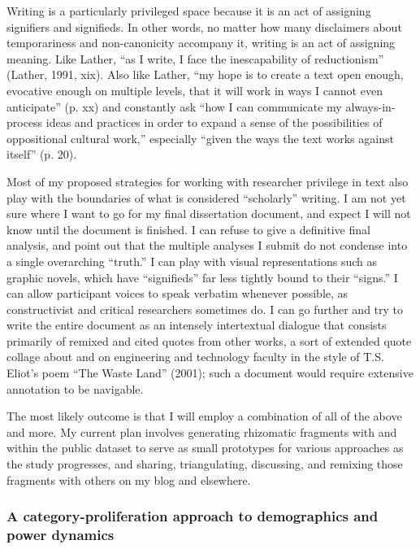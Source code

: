 Writing is a particularly privileged space because it is an act of assigning signifiers and signifieds. In other words, no matter how many disclaimers about temporariness and non-canonicity accompany it, writing is an act of assigning meaning. Like Lather, “as I write, I face the inescapability of reductionism” (Lather, 1991, xix). Also like Lather, “my hope is to create a text open enough, evocative enough on multiple levels, that it will work in ways I cannot even anticipate” (p. xx) and constantly ask “how I can communicate my always-in-process ideas and practices in order to expand a sense of the possibilities of oppositional cultural work,” especially “given the ways the text works against itself” (p. 20).

Most of my proposed strategies for working with researcher privilege in text also play with the boundaries of what is considered “scholarly” writing. I am not yet sure where I want to go for my final dissertation document, and expect I will not know until the document is finished. I can refuse to give a definitive final analysis, and point out that the multiple analyses I submit do not condense into a single overarching “truth.” I can play with visual representations such as graphic novels, which have “signifieds” far less tightly bound to their “signs.” I can allow participant voices to speak verbatim whenever possible, as constructivist and critical researchers sometimes do. I can go further and try to write the entire document as an intensely intertextual dialogue that consists primarily of remixed and cited quotes from other works, a sort of extended quote collage about and on engineering and technology faculty in the style of T.S. Eliot’s poem “The Waste Land” (2001); such a document would require extensive annotation to be navigable.

The most likely outcome is that I will employ a combination of all of the above and more. My current plan involves generating rhizomatic fragments with and within the public dataset to serve as small prototypes for various approaches as the study progresses, and sharing, triangulating, discussing, and remixing those fragments with others on my blog and elsewhere.

\subsubsection{A category-proliferation approach to demographics and power dynamics}

